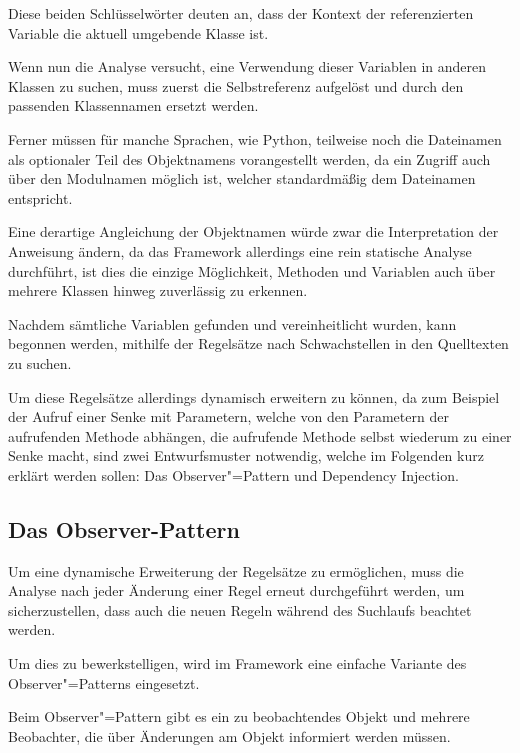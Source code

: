         Diese beiden Schlüsselwörter deuten an,
        dass der Kontext der referenzierten Variable die aktuell umgebende Klasse ist.

        Wenn nun die Analyse versucht,
        eine Verwendung dieser Variablen in anderen Klassen zu suchen,
        muss zuerst die Selbstreferenz aufgelöst und
        durch den passenden Klassennamen ersetzt werden.

        Ferner müssen für manche Sprachen,
        wie Python,
        teilweise noch die Dateinamen als optionaler Teil des Objektnamens vorangestellt werden,
        da ein Zugriff auch über den Modulnamen möglich ist,
        welcher standardmäßig dem Dateinamen entspricht.

        Eine derartige Angleichung der Objektnamen würde zwar die Interpretation der Anweisung ändern,
        da das Framework allerdings eine rein statische Analyse durchführt,
        ist dies die einzige Möglichkeit,
        Methoden und
        Variablen auch über mehrere Klassen hinweg zuverlässig zu erkennen.

        Nachdem sämtliche Variablen gefunden und
        vereinheitlicht wurden,
        kann begonnen werden,
        mithilfe der Regelsätze nach Schwachstellen in den Quelltexten zu suchen.

        Um diese Regelsätze allerdings dynamisch erweitern zu können,
        da zum Beispiel der Aufruf einer Senke mit Parametern,
        welche von den Parametern der aufrufenden Methode abhängen,
        die aufrufende Methode selbst wiederum zu einer Senke macht,
        sind zwei Entwurfsmuster notwendig,
        welche im Folgenden kurz erklärt werden sollen:
        Das Observer"=Pattern und
        Dependency Injection.

        \subsection{Das Observer-Pattern}
            Um eine dynamische Erweiterung der Regelsätze zu ermöglichen,
            muss die Analyse nach jeder Änderung einer Regel erneut durchgeführt werden,
            um sicherzustellen,
            dass auch die neuen Regeln während des Suchlaufs beachtet werden.

            Um dies zu bewerkstelligen,
            wird im Framework eine einfache Variante des Observer"=Patterns eingesetzt.

            Beim Observer"=Pattern gibt es ein zu beobachtendes Objekt und
            mehrere Beobachter,
            die über Änderungen am Objekt informiert werden müssen.

